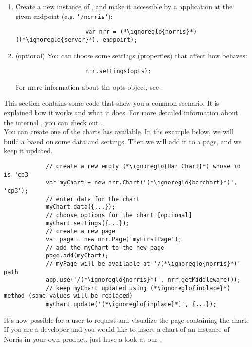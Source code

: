 \begin{itemize}
\begin{enumerate}
				\begin{lstlisting}
					var (*\ignoreglo{norris}*) = require('(*\ignoreglo{norris}*)');
				\end{lstlisting}
				\item Create a new instance of , and make it accessible by a  application at the given endpoint (e.g. \texttt{'/norris'}):
				\begin{lstlisting}
					var nrr = (*\ignoreglo{norris}*)((*\ignoreglo{server}*), endpoint);
				\end{lstlisting}
				\item (optional) You can choose some settings (properties) that affect how  behaves:
				\begin{lstlisting}
					nrr.settings(opts);
				\end{lstlisting}
				For more information about the opts object, see .
			\end{enumerate}
		\end{itemize}
		This section contains some code that show you a common scenario. It is explained how it works and what it does. For more detailed information about the internal , you can check out .\\
		You can create one of the charts  has available. In the example below, we will build a  based on some data and settings. Then we will add it to a page, and we keep it updated.
		\begin{lstlisting}
			// create a new empty (*\ignoreglo{Bar Chart}*) whose id is 'cp3'
			var myChart = new nrr.Chart('(*\ignoreglo{barchart}*)', 'cp3');
			// enter data for the chart
			myChart.data({...});
			// choose options for the chart [optional]
			myChart.settings({...});
			// create a new page
			var page = new nrr.Page('myFirstPage');
			// add the myChart to the new page
			page.add(myChart);
			// myPage will be available at '/(*\ignoreglo{norris}*)' path
			app.use('/(*\ignoreglo{norris}*)', nrr.getMiddleware());
			// keep myChart updated using (*\ignoreglo{inplace}*) method (some values will be replaced)
			myChart.update('(*\ignoreglo{inplace}*)', {...});
		\end{lstlisting}
		It's now possible for a user to request and visualize the page containing the chart.\\
		If you are a developer and you would like to insert a chart of an instance of Norris in your own product, just have a look at our .
